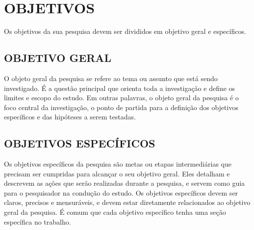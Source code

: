 \section{OBJETIVOS}
Os objetivos da sua pesquisa devem ser divididos em objetivo geral e específicos.

\subsection{OBJETIVO GERAL}
O objeto geral da pesquisa se refere ao tema ou assunto que está sendo investigado. É a questão principal que orienta toda a investigação e define os limites e escopo do estudo. Em outras palavras, o objeto geral da pesquisa é o foco central da investigação, o ponto de partida para a definição dos objetivos específicos e das hipóteses a serem testadas.

\subsection{OBJETIVOS ESPECÍFICOS}
Os objetivos específicos da pesquisa são metas ou etapas intermediárias que precisam ser cumpridas para alcançar o seu objetivo geral. Eles detalham e descrevem as ações que serão realizadas durante a pesquisa, e servem como guia para o pesquisador na condução do estudo. Os objetivos específicos devem ser claros, precisos e mensuráveis, e devem estar diretamente relacionados ao objetivo geral da pesquisa. É comum que cada objetivo específico tenha uma seção específica no trabalho.